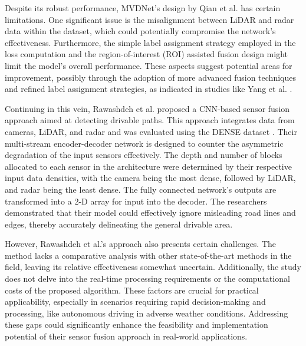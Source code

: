 \documentclass[report.tex]{subfiles}
\begin{document}
    Despite its robust performance, MVDNet's design by Qian et al. \cite{qian2021robust} has certain limitations. One significant issue is the misalignment between LiDAR and radar data within the dataset, which could potentially compromise the network's effectiveness. Furthermore, the simple label assignment strategy employed in the loss computation and the region-of-interest (ROI) assisted fusion design might limit the model's overall performance. These aspects suggest potential areas for improvement, possibly through the adoption of more advanced fusion techniques and refined label assignment strategies, as indicated in studies like Yang et al. \cite{yang2022ralibev}.

    Continuing in this vein, Rawashdeh et al. \cite{rawashdeh2021drivable} proposed a CNN-based sensor fusion approach aimed at detecting drivable paths. This approach integrates data from cameras, LiDAR, and radar and was evaluated using the DENSE dataset \cite{bijelic2020seeing}. Their multi-stream encoder-decoder network is designed to counter the asymmetric degradation of the input sensors effectively. The depth and number of blocks allocated to each sensor in the architecture were determined by their respective input data densities, with the camera being the most dense, followed by LiDAR, and radar being the least dense. The fully connected network's outputs are transformed into a 2-D array for input into the decoder. The researchers demonstrated that their model could effectively ignore misleading road lines and edges, thereby accurately delineating the general drivable area.

    However, Rawashdeh et al.'s approach \cite{rawashdeh2021drivable} also presents certain challenges. The method lacks a comparative analysis with other state-of-the-art methods in the field, leaving its relative effectiveness somewhat uncertain. Additionally, the study does not delve into the real-time processing requirements or the computational costs of the proposed algorithm. These factors are crucial for practical applicability, especially in scenarios requiring rapid decision-making and processing, like autonomous driving in adverse weather conditions. Addressing these gaps could significantly enhance the feasibility and implementation potential of their sensor fusion approach in real-world applications.



\end{document}
